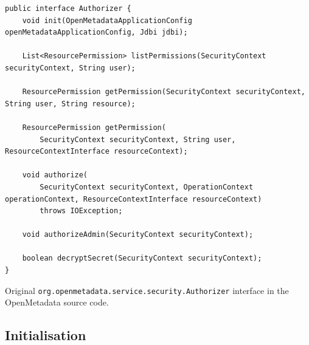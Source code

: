 \begin{listing}

\begin{verbatim}
public interface Authorizer {
    void init(OpenMetadataApplicationConfig openMetadataApplicationConfig, Jdbi jdbi);

    List<ResourcePermission> listPermissions(SecurityContext securityContext, String user);

    ResourcePermission getPermission(SecurityContext securityContext, String user, String resource);

    ResourcePermission getPermission(
        SecurityContext securityContext, String user, ResourceContextInterface resourceContext);

    void authorize(
        SecurityContext securityContext, OperationContext operationContext, ResourceContextInterface resourceContext)
        throws IOException;

    void authorizeAdmin(SecurityContext securityContext);

    boolean decryptSecret(SecurityContext securityContext);
}
\end{verbatim}

\caption{Original \texttt{org.openmetadata.service.security.Authorizer} interface in the OpenMetadata source code.}
\label{listing:original_authorizer}

\end{listing}

\subsection{Initialisation}

